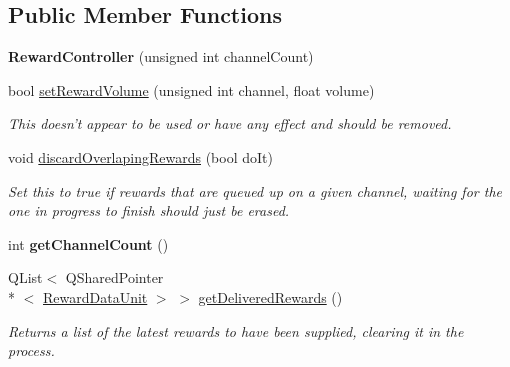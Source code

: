 \subsection*{Public Member Functions}
\begin{DoxyCompactItemize}
\item 
\hypertarget{class_picto_1_1_reward_controller_a304c608453d6457840c8ef68d4772345}{{\bfseries Reward\-Controller} (unsigned int channel\-Count)}\label{class_picto_1_1_reward_controller_a304c608453d6457840c8ef68d4772345}

\item 
\hypertarget{class_picto_1_1_reward_controller_ae46b911316ae8383a92fd62d3e6e0a30}{bool \hyperlink{class_picto_1_1_reward_controller_ae46b911316ae8383a92fd62d3e6e0a30}{set\-Reward\-Volume} (unsigned int channel, float volume)}\label{class_picto_1_1_reward_controller_ae46b911316ae8383a92fd62d3e6e0a30}

\begin{DoxyCompactList}\small\item\em This doesn't appear to be used or have any effect and should be removed. \end{DoxyCompactList}\item 
\hypertarget{class_picto_1_1_reward_controller_a0ea32b937d64aeaf7928ee4b696d697b}{void \hyperlink{class_picto_1_1_reward_controller_a0ea32b937d64aeaf7928ee4b696d697b}{discard\-Overlaping\-Rewards} (bool do\-It)}\label{class_picto_1_1_reward_controller_a0ea32b937d64aeaf7928ee4b696d697b}

\begin{DoxyCompactList}\small\item\em Set this to true if rewards that are queued up on a given channel, waiting for the one in progress to finish should just be erased. \end{DoxyCompactList}\item 
\hypertarget{class_picto_1_1_reward_controller_a20eab2fa7e1441b4f54e94332589a3bd}{int {\bfseries get\-Channel\-Count} ()}\label{class_picto_1_1_reward_controller_a20eab2fa7e1441b4f54e94332589a3bd}

\item 
\hypertarget{class_picto_1_1_reward_controller_a1a56936f22612a215077b3ab494b27c5}{Q\-List$<$ Q\-Shared\-Pointer\\*
$<$ \hyperlink{class_picto_1_1_reward_data_unit}{Reward\-Data\-Unit} $>$ $>$ \hyperlink{class_picto_1_1_reward_controller_a1a56936f22612a215077b3ab494b27c5}{get\-Delivered\-Rewards} ()}\label{class_picto_1_1_reward_controller_a1a56936f22612a215077b3ab494b27c5}

\begin{DoxyCompactList}\small\item\em Returns a list of the latest rewards to have been supplied, clearing it in the process. \end{DoxyCompactList}\end{DoxyCompactItemize}
